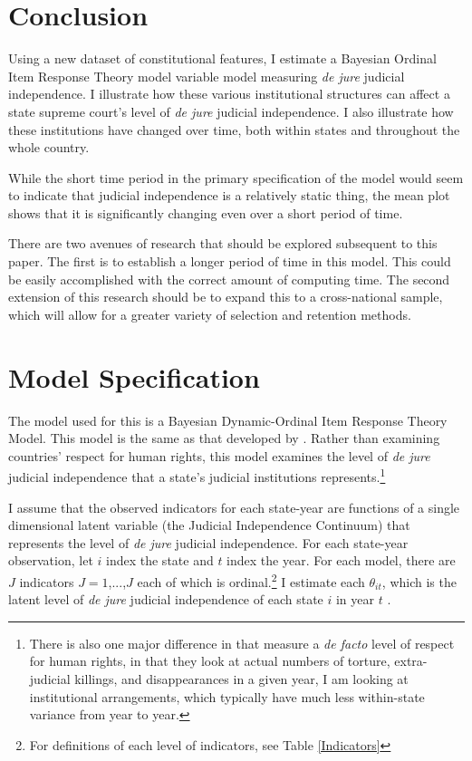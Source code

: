 \documentclass[12pt]{article}
\begin{document}
\section{Conclusion}
Using a new dataset of constitutional features, I estimate a Bayesian Ordinal Item Response Theory model variable model measuring \textit{de jure} judicial independence.  I illustrate how these various institutional structures can affect a state supreme court's level of \textit{de jure} judicial independence.  I also illustrate how these institutions have changed over time, both within states and throughout the whole country.  

While the short time period in the primary specification of the model would seem to indicate that judicial independence is a relatively static thing, the mean plot shows that it is significantly changing even over a short period of time. 

There are two avenues of research that should be explored subsequent to this paper.  The first is to establish a longer period of time in this model.  This could be easily accomplished with the correct amount of computing time.  The second extension of this research should be to expand this to a cross-national sample, which will allow for a greater variety of selection and retention methods.

\newpage
\singlespacing



\appendix
\section{Model Specification}\label{ModelApp}
The model used for this is a Bayesian Dynamic-Ordinal Item Response Theory Model.  This model is the same as that developed by \citet{Schnakenberg2014}.  Rather than examining countries' respect for human rights, this model examines the level of \textit{de jure} judicial independence that a state's judicial institutions represents.\footnote{There is also one major difference in that \citeauthor{Schnakenberg2014} measure a \textit{de facto} level of respect for human rights, in that they look at actual numbers of torture, extra-judicial killings, and disappearances in a given year, I am looking at institutional arrangements, which typically have much less within-state variance from year to year.}	

I assume that the observed indicators for each state-year are functions of a single dimensional latent variable (the Judicial Independence Continuum) that represents the level of \textit{de jure} judicial independence.  For each state-year observation, let $i$ index the state and $t$ index the year.  For each model, there are $J$ indicators $J=1$,...,$J$ each of which is ordinal.\footnote{For definitions of each level of indicators, see Table \ref{Indicators}} I estimate each $\theta_{it}$, which is the latent level of \textit{de jure} judicial independence of each state $i$ in year $t$ \citep[7]{Schnakenberg2014}.
\end{document}
